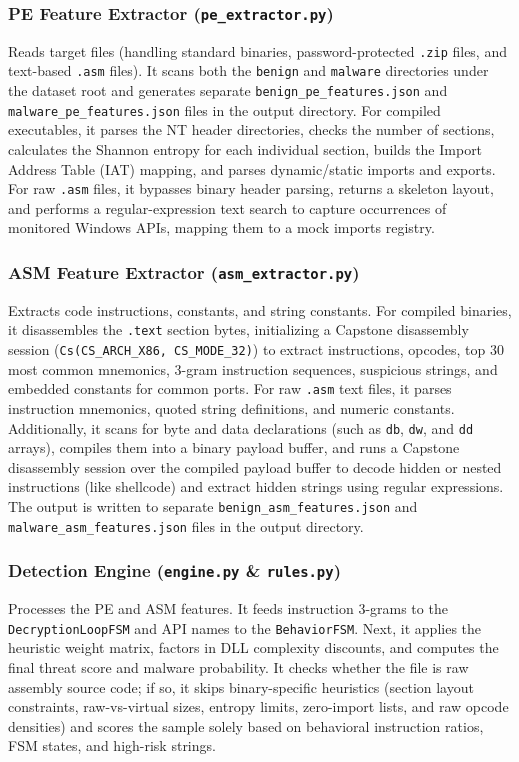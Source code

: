 \documentclass[11pt,a4paper]{article}
\begin{document}
\subsubsection{PE Feature Extractor (\texttt{pe\_extractor.py})}
Reads target files (handling standard binaries, password-protected \texttt{.zip} files, and text-based \texttt{.asm} files). It scans both the \texttt{benign} and \texttt{malware} directories under the dataset root and generates separate \texttt{benign\_pe\_features.json} and \texttt{malware\_pe\_features.json} files in the output directory. For compiled executables, it parses the NT header directories, checks the number of sections, calculates the Shannon entropy for each individual section, builds the Import Address Table (IAT) mapping, and parses dynamic/static imports and exports. For raw \texttt{.asm} files, it bypasses binary header parsing, returns a skeleton layout, and performs a regular-expression text search to capture occurrences of monitored Windows APIs, mapping them to a mock imports registry.

\subsubsection{ASM Feature Extractor (\texttt{asm\_extractor.py})}
Extracts code instructions, constants, and string constants. For compiled binaries, it disassembles the \texttt{.text} section bytes, initializing a Capstone disassembly session (\texttt{Cs(CS\_ARCH\_X86, CS\_MODE\_32)}) to extract instructions, opcodes, top 30 most common mnemonics, 3-gram instruction sequences, suspicious strings, and embedded constants for common ports. For raw \texttt{.asm} text files, it parses instruction mnemonics, quoted string definitions, and numeric constants. Additionally, it scans for byte and data declarations (such as \texttt{db}, \texttt{dw}, and \texttt{dd} arrays), compiles them into a binary payload buffer, and runs a Capstone disassembly session over the compiled payload buffer to decode hidden or nested instructions (like shellcode) and extract hidden strings using regular expressions. The output is written to separate \texttt{benign\_asm\_features.json} and \texttt{malware\_asm\_features.json} files in the output directory.

\subsubsection{Detection Engine (\texttt{engine.py} \& \texttt{rules.py})}
Processes the PE and ASM features. It feeds instruction 3-grams to the \texttt{DecryptionLoopFSM} and API names to the \texttt{BehaviorFSM}. Next, it applies the heuristic weight matrix, factors in DLL complexity discounts, and computes the final threat score and malware probability. It checks whether the file is raw assembly source code; if so, it skips binary-specific heuristics (section layout constraints, raw-vs-virtual sizes, entropy limits, zero-import lists, and raw opcode densities) and scores the sample solely based on behavioral instruction ratios, FSM states, and high-risk strings.
\end{document}
